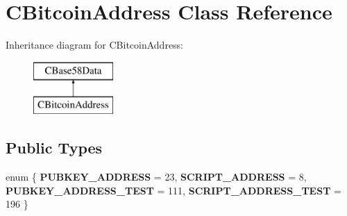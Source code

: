 \hypertarget{class_c_bitcoin_address}{}\section{C\+Bitcoin\+Address Class Reference}
\label{class_c_bitcoin_address}
Inheritance diagram for C\+Bitcoin\+Address\+:\begin{figure}[H]
\begin{center}
\leavevmode
\includegraphics[height=2.000000cm]{class_c_bitcoin_address}
\end{center}
\end{figure}
\subsection*{Public Types}
\begin{DoxyCompactItemize}
\item 
\mbox{\label{class_c_bitcoin_address_ab7133560064a51922de0cefb4029e164}} 
enum \{ {\bfseries P\+U\+B\+K\+E\+Y\+\_\+\+A\+D\+D\+R\+E\+SS} = 23, 
{\bfseries S\+C\+R\+I\+P\+T\+\_\+\+A\+D\+D\+R\+E\+SS} = 8, 
{\bfseries P\+U\+B\+K\+E\+Y\+\_\+\+A\+D\+D\+R\+E\+S\+S\+\_\+\+T\+E\+ST} = 111, 
{\bfseries S\+C\+R\+I\+P\+T\+\_\+\+A\+D\+D\+R\+E\+S\+S\+\_\+\+T\+E\+ST} = 196
 \}
\end{DoxyCompactItemize}
